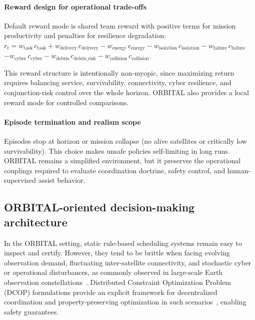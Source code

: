 \documentclass[sigconf]{aamas}
\begin{document}
\paragraph{Reward design for operational trade-offs}
Default reward mode is shared team reward with positive terms for mission productivity and penalties for resilience degradation:
$r_t = w_{\text{task}} \, c_{\text{task}}
    + w_{\text{delivery}} \, c_{\text{delivery}}
    - w_{\text{energy}} \, c_{\text{energy}}
    - w_{\text{isolation}} \, c_{\text{isolation}}
    - w_{\text{failure}} \, c_{\text{failure}}$
$- w_{\text{cyber}} \, c_{\text{cyber}}
    - w_{\text{debris}} \, c_{\text{debris\_risk}}
    - w_{\text{collision}} \, c_{\text{collision}}.$

This reward structure is intentionally non-myopic, since maximizing return requires balancing service, survivability, connectivity, cyber resilience, and conjunction-risk control over the whole horizon. ORBITAL also provides a local reward mode for controlled comparisons.

\paragraph{Episode termination and realism scope}
Episodes stop at horizon or mission collapse (no alive satellites or critically low survivability). This choice makes unsafe policies self-limiting in long runs. ORBITAL remains a simplified environment, but it preserves the operational couplings required to evaluate coordination doctrine, safety control, and human-supervised assist behavior.

\subsection{ORBITAL-oriented decision-making architecture}

In the ORBITAL setting, static rule-based scheduling systems remain easy to inspect and certify. However, they tend to be brittle when facing evolving observation demand, fluctuating inter-satellite connectivity, and stochastic cyber or operational disturbances, as commonly observed in large-scale Earth observation constellations~\cite{zilberstein2026largescalecontinualschedulingexecution}. Distributed Constraint Optimization Problem (DCOP) formulations provide an explicit framework for decentralized coordination and property-preserving optimization in such scenarios~\cite{Krigman2024}, enabling safety guarantees.
\end{document}
